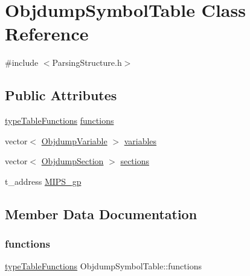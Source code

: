\hypertarget{classObjdumpSymbolTable}{}\section{Objdump\+Symbol\+Table Class Reference}
\label{classObjdumpSymbolTable}


{\ttfamily \#include $<$Parsing\+Structure.\+h$>$}

\subsection*{Public Attributes}
\begin{DoxyCompactItemize}
\item 
\hyperlink{ParsingStructure_8h_ad79e005bed4a85debb44d5568444887a}{type\+Table\+Functions} \hyperlink{classObjdumpSymbolTable_a847d9dee179949a91a6419a68c04832a}{functions}
\item 
vector$<$ \hyperlink{classObjdumpVariable}{Objdump\+Variable} $>$ \hyperlink{classObjdumpSymbolTable_adfc2a9a65eddc1af3f7e493ef9287cdb}{variables}
\item 
vector$<$ \hyperlink{classObjdumpSection}{Objdump\+Section} $>$ \hyperlink{classObjdumpSymbolTable_a0a58d1a9bf16f9e3cf5cc14b16bbc5e0}{sections}
\item 
t\+\_\+address \hyperlink{classObjdumpSymbolTable_a6623818803960d73cf63007bddec4732}{M\+I\+P\+S\+\_\+gp}
\end{DoxyCompactItemize}


\subsection{Member Data Documentation}
\mbox{\label{classObjdumpSymbolTable_a847d9dee179949a91a6419a68c04832a}} 
\subsubsection{\texorpdfstring{functions}{functions}}
{\footnotesize\ttfamily \hyperlink{ParsingStructure_8h_ad79e005bed4a85debb44d5568444887a}{type\+Table\+Functions} Objdump\+Symbol\+Table\+::functions}

\mbox{\label{classObjdumpSymbolTable_a6623818803960d73cf63007bddec4732}} 
